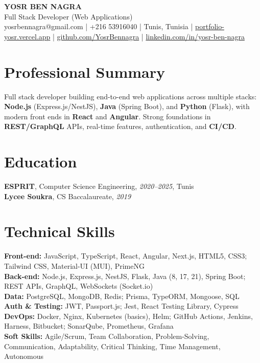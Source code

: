 \documentclass[10pt,a4paper]{article}
\begin{document}
\begin{center}
  {\Large\bfseries YOSR BEN NAGRA}\\[2pt]
  {\small Full Stack Developer (Web Applications)}\\[3pt]
  {\footnotesize yosrbennagra@gmail.com \;|\; +216 53916040 \;|\; Tunis, Tunisia \;|\; \href{https://portfolio-yosr.vercel.app/en}{portfolio-yosr.vercel.app} \;|\; \href{https://github.com/YosrBennagra}{github.com/YosrBennagra} \;|\; \href{https://www.linkedin.com/in/yosr-ben-nagra/}{linkedin.com/in/yosr-ben-nagra}}
\end{center}

\section*{Professional Summary}
{\small
Full stack developer building end-to-end web applications across multiple stacks: \textbf{Node.js} (Express.js/NestJS), \textbf{Java} (Spring Boot), and \textbf{Python} (Flask), with modern front ends in \textbf{React} and \textbf{Angular}. Strong foundations in \textbf{REST/GraphQL} APIs, real-time features, authentication, and \textbf{CI/CD}.
}

\vspace{4pt}

\section*{Education}
{\small
\textbf{ESPRIT}, Computer Science Engineering, \textit{2020--2025}, Tunis\\[1pt]
\textbf{Lycee Soukra}, CS Baccalaureate, \textit{2019}
}

\vspace{4pt}

\section*{Technical Skills}
{\small
\textbf{Front-end:} JavaScript, TypeScript, React, Angular, Next.js, HTML5, CSS3; Tailwind CSS, Material-UI (MUI), PrimeNG\\[2pt]
\textbf{Back-end:} Node.js, Express.js, NestJS, Flask, Java (8, 17, 21), Spring Boot; REST APIs, GraphQL, WebSockets (Socket.io)\\[2pt]
\textbf{Data:} PostgreSQL, MongoDB, Redis; Prisma, TypeORM, Mongoose, SQL\\[2pt]
\textbf{Auth \& Testing:} JWT, Passport.js; Jest, React Testing Library, Cypress\\[2pt]
\textbf{DevOps:} Docker, Nginx, Kubernetes (basics), Helm; GitHub Actions, Jenkins, Harness, Bitbucket; SonarQube, Prometheus, Grafana\\[2pt]
\textbf{Soft Skills:} Agile/Scrum, Team Collaboration, Problem-Solving, Communication, Adaptability, Critical Thinking, Time Management, Autonomous
}
\end{document}
